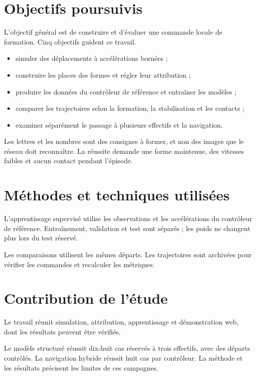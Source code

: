 \section{Objectifs poursuivis}
L'objectif général est de construire et d'évaluer une commande locale de formation. Cinq objectifs guident ce travail.
\begin{itemize}\setlength{\itemsep}{0pt}
\item simuler des déplacements à accélérations bornées ;
\item construire les places des formes et régler leur attribution ;
\item produire les données du contrôleur de référence et entraîner les modèles ;
\item comparer les trajectoires selon la formation, la stabilisation et les contacts ;
\item examiner séparément le passage à plusieurs effectifs et la navigation.
\end{itemize}
Les lettres et les nombres sont des consignes à former, et non des images que le réseau doit reconnaître. La réussite demande une forme maintenue, des vitesses faibles et aucun contact pendant l'épisode.

\section{Méthodes et techniques utilisées}
L'apprentissage supervisé utilise les observations et les accélérations du contrôleur de référence. Entraînement, validation et test sont séparés ; les poids ne changent plus lors du test réservé.

Les comparaisons utilisent les mêmes départs. Les trajectoires sont archivées pour vérifier les commandes et recalculer les métriques.

\section{Contribution de l'étude}
Le travail réunit simulation, attribution, apprentissage et démonstration web, dont les résultats peuvent être vérifiés.

Le modèle structuré réussit dix-huit cas réservés à trois effectifs, avec des départs contrôlés. La navigation hybride réussit huit cas par contrôleur. La méthode et les résultats précisent les limites de ces campagnes.

